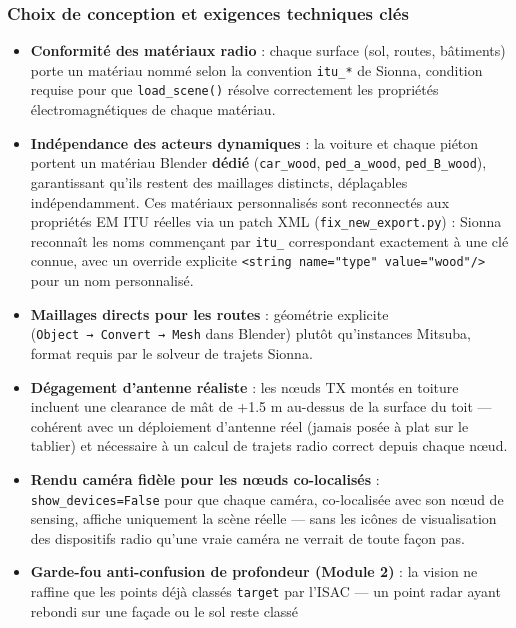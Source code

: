 \documentclass[11pt]{article}
\providecommand{\tightlist}{%
      \setlength{\itemsep}{0pt}\setlength{\parskip}{0pt}}
\begin{document}
\subsubsection{Choix de conception et exigences techniques
clés}\label{choix-de-conception-et-exigences-techniques-cluxe9s}

\begin{itemize}
\tightlist
\item
  \textbf{Conformité des matériaux radio} : chaque surface (sol, routes,
  bâtiments) porte un matériau nommé selon la convention \texttt{itu\_*}
  de Sionna, condition requise pour que \texttt{load\_scene()} résolve
  correctement les propriétés électromagnétiques de chaque matériau.
\item
  \textbf{Indépendance des acteurs dynamiques} : la voiture et chaque
  piéton portent un matériau Blender \textbf{dédié} (\texttt{car\_wood},
  \texttt{ped\_a\_wood}, \texttt{ped\_B\_wood}), garantissant qu'ils
  restent des maillages distincts, déplaçables indépendamment. Ces
  matériaux personnalisés sont reconnectés aux propriétés EM ITU réelles
  via un patch XML (\texttt{fix\_new\_export.py}) : Sionna reconnaît les
  noms commençant par \texttt{itu\_} correspondant exactement à une clé
  connue, avec un override explicite
  \texttt{\textless{}string\ name="type"\ value="wood"/\textgreater{}}
  pour un nom personnalisé.
\item
  \textbf{Maillages directs pour les routes} : géométrie explicite
  (\texttt{Object\ →\ Convert\ →\ Mesh} dans Blender) plutôt
  qu'instances Mitsuba, format requis par le solveur de trajets Sionna.
\item
  \textbf{Dégagement d'antenne réaliste} : les nœuds TX montés en
  toiture incluent une clearance de mât de +1.5 m au-dessus de la
  surface du toit --- cohérent avec un déploiement d'antenne réel
  (jamais posée à plat sur le tablier) et nécessaire à un calcul de
  trajets radio correct depuis chaque nœud.
\item
  \textbf{Rendu caméra fidèle pour les nœuds co-localisés} :
  \texttt{show\_devices=False} pour que chaque caméra, co-localisée avec
  son nœud de sensing, affiche uniquement la scène réelle --- sans les
  icônes de visualisation des dispositifs radio qu'une vraie caméra ne
  verrait de toute façon pas.
\item
  \textbf{Garde-fou anti-confusion de profondeur (Module 2)} : la vision
  ne raffine que les points déjà classés \texttt{target} par l'ISAC ---
  un point radar ayant rebondi sur une façade ou le sol reste classé

\end{itemize}
\end{document}

